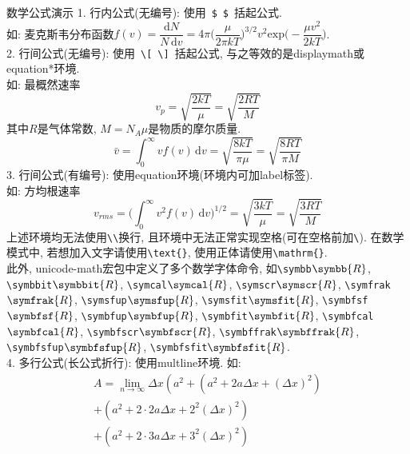 \documentclass[hyperref,UTF8,11pt]{beamer}
\begin{document}
\begin{frame}{数学公式演示}
	{\color{JXred}1. 行内公式(无编号):} 使用~\verb|$|~\verb|$|~括起公式.\\
	如: 麦克斯韦分布函数$f(v) = \dfrac{\mathrm{d}N}{N\,\mathrm{d}v} = 4\pi \Big(\dfrac{\mu}{2\pi kT}\Big)^{3/2} v^2 \mathrm{exp}\Big(-\dfrac{\mu v^2}{2kT}\Big)$.\\[1ex]
	{\color{JXred}2. 行间公式(无编号):} 使用~\verb|\[|~\verb|\]|~括起公式, 与之等效的是displaymath或equation*环境.\\
	如: 最概然速率\[v_p = \sqrt{\dfrac{2kT}{\mu}} = \sqrt{\dfrac{2RT}{M}}\]其中$R$是气体常数, $M = N_A \mu$是物质的摩尔质量.\\[1ex]
		\begin{equation*}
			\bar{v} = \int_0^\infty vf(v)\,\mathrm{d}v = \sqrt{\dfrac{8kT}{\pi\mu}} = \sqrt{\dfrac{8RT}{\pi M}}
		\end{equation*}
	{\color{JXred}3. 行间公式(有编号):} 使用equation环境(环境内可加label标签).\\[1ex]
	如: 方均根速率
		\begin{equation}
		v_{rms} = \Big(\int_0^\infty v^2f(v)\,\mathrm{d}v\Big)^{1/2} = \sqrt{\dfrac{3kT}{\mu}} = \sqrt{\dfrac{3RT}{M}}
		\end{equation}
	上述环境均无法使用\verb!\\!换行, 且环境中无法正常实现空格(可在空格前加\verb|\|). 在数学模式中, 若想加入文字请使用\verb|\text|\verb|{}|, 使用正体请使用\verb|\mathrm|\verb|{}|.\\
	此外, unicode-math宏包中定义了多个数学字体命令, 如\verb|\symbb|$\symbb{R}$, \verb|\symbbit|$\symbbit{R}$, \verb|\symcal|$\symcal{R}$, \verb|\symscr|$\symscr{R}$, \verb|\symfrak|$\symfrak{R}$, \verb|\symsfup|$\symsfup{R}$, \verb|\symsfit|$\symsfit{R}$, \verb|\symbfsf|$\symbfsf{R}$, \verb|\symbfup|$\symbfup{R}$, \verb|\symbfit|$\symbfit{R}$, \verb|\symbfcal|$\symbfcal{R}$, \verb|\symbfscr|$\symbfscr{R}$, \verb|\symbffrak|$\symbffrak{R}$, \verb|\symbfsfup|$\symbfsfup{R}$, \verb|\symbfsfit|$\symbfsfit{R}$.\\[1ex]
	{\color{JXred}4. 多行公式(长公式折行):} 使用multline环境.
	如: 
		\begin{multline}
			A=\lim_{n\rightarrow\infty}\Delta x\left(a^{2}+\left(a^{2}+2a\Delta x+\left(\Delta x\right)^{2}\right)\right.\label{eq:reset}\\
			+\left(a^{2}+2\cdot2a\Delta x+2^{2}\left(\Delta x\right)^{2}\right)\\
			+\left(a^{2}+2\cdot3a\Delta x+3^{2}\left(\Delta x\right)^{2}\right)\\

\end{multline}
\end{frame}
\end{document}

